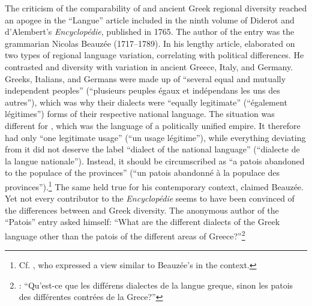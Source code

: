 The criticism of the comparability of  and ancient Greek regional diversity reached an apogee in the “Langue” article included in the ninth volume of Diderot and d’Alembert’s \textit{Encyclopédie}, published in 1765. The author of the entry was the  grammarian Nicolas Beauzée (1717–1789). In his lengthy article, \citet[249]{Beauzee1765} elaborated on two types of regional language variation, correlating with political differences. He contrasted  and  diversity with variation in ancient Greece, Italy, and Germany. Greeks, Italians, and Germans were made up of “several equal and mutually independent peoples” (“plusieurs peuples égaux et indépendans les uns des autres”), which was why their dialects were “equally legitimate” (“également légitimes”) forms of their respective national language. The situation was different for , which was the language of a politically unified empire. It therefore had only “one legitimate usage” (“un usage légitime”), while everything deviating from it did not deserve the label “dialect of the national language” (“dialecte de la langue nationale”). Instead, it should be circumscribed as “a patois abandoned to the populace of the provinces” (“un patois abandonné à la populace des provinces”).\footnote{Cf. \citet[135--136]{Priestley1762}, who expressed a view similar to Beauzée’s in the  context.} The same held true for his contemporary  context, claimed Beauzée. Yet not every contributor to the \textit{Encyclopédie} seems to have been convinced of the differences between  and Greek diversity. The anonymous author of the “Patois” entry asked himself: “What are the different dialects of the Greek language other than the patois of the different areas of Greece?”\footnote{\citet[174]{Anon.1765}: “Qu’est-ce que les différens dialectes de la langue greque, sinon les patois des différentes contrées de la Grece?”}

